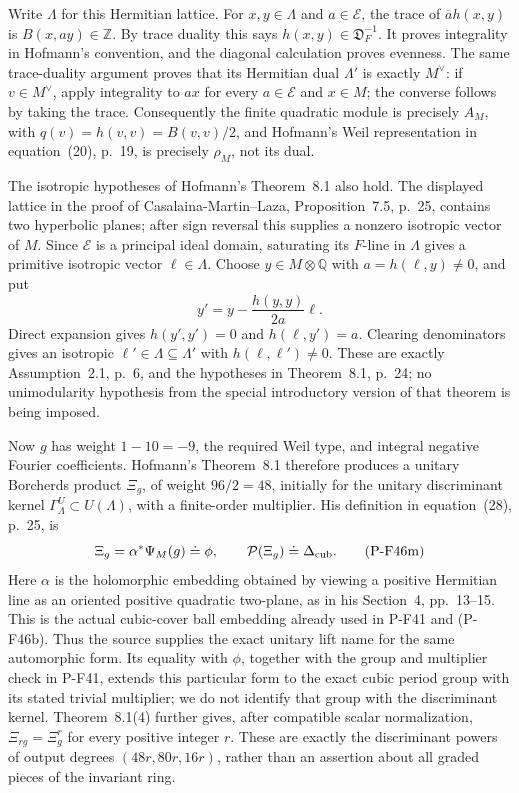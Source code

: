 Write $\Lambda$ for this Hermitian lattice. For
$x,y\in\Lambda$ and $a\in\mathcal E$, the trace
of $\overline a h(x,y)$ is $B(x,ay)\in\mathbb Z$.
By trace duality this says
$h(x,y)\in\mathfrak D_F^{-1}$. It proves integrality
in Hofmann's convention, and the diagonal calculation
proves evenness. The same trace-duality argument proves
that its Hermitian dual $\Lambda'$ is exactly $M^\vee$:
if $v\in M^\vee$, apply integrality to $ax$ for every
$a\in\mathcal E$ and $x\in M$; the converse follows
by taking the trace. Consequently the finite quadratic
module is precisely $A_M$, with
$q(v)=h(v,v)=B(v,v)/2$, and Hofmann's Weil
representation in equation~(20), p.~19, is precisely
$\rho_M$, not its dual.

The isotropic hypotheses of Hofmann's Theorem~8.1
also hold. The displayed lattice in the proof of
Casalaina-Martin--Laza, Proposition~7.5, p.~25,
contains two hyperbolic planes; after sign reversal
this supplies a nonzero isotropic vector of $M$.
Since $\mathcal E$ is a principal ideal domain,
saturating its $F$-line in $\Lambda$ gives a primitive
isotropic vector $\ell\in\Lambda$.
Choose $y\in M\otimes\mathbb Q$ with
$a=h(\ell,y)\ne0$, and put
\[
              y'=y-\frac{h(y,y)}{2a}\ell.
\]
Direct expansion gives $h(y',y')=0$ and
$h(\ell,y')=a$. Clearing denominators gives an
isotropic $\ell'\in\Lambda\subseteq\Lambda'$ with
$h(\ell,\ell')\ne0$. These are exactly Assumption~2.1,
p.~6, and the hypotheses in Theorem~8.1, p.~24;
no unimodularity hypothesis from the special introductory
version of that theorem is being imposed.

Now $g$ has weight $1-10=-9$, the required Weil type,
and integral negative Fourier coefficients. Hofmann's
Theorem~8.1 therefore produces a unitary Borcherds
product $\Xi_g$, of weight $96/2=48$, initially for
the unitary discriminant kernel
$\Gamma^U_\Lambda\subset U(\Lambda)$, with a
finite-order multiplier. His definition in
equation~(28), p.~25, is
\[
        \Xi_g=\alpha^*\Psi_M(g)\doteq\phi,
        \qquad \mathcal P(\Xi_g)\doteq\Delta_{\rm cub}.
 \tag{P-F46m}
\]
Here $\alpha$ is the holomorphic embedding obtained
by viewing a positive Hermitian line as an oriented
positive quadratic two-plane, as in his Section~4,
pp.~13--15. This is the actual cubic-cover ball
embedding already used in P-F41 and (P-F46b).
Thus the source supplies the exact unitary lift name
for the same automorphic form. Its equality with
$\phi$, together with the group and multiplier check
in P-F41, extends this particular form to the exact
cubic period group with its stated trivial multiplier;
we do not identify that group with the discriminant
kernel. Theorem~8.1(4) further gives, after compatible
scalar normalization,
$\Xi_{r g}=\Xi_g^r$ for every positive integer $r$.
These are exactly the discriminant powers of output
degrees $(48r,80r,16r)$, rather than an assertion about
all graded pieces of the invariant ring.

